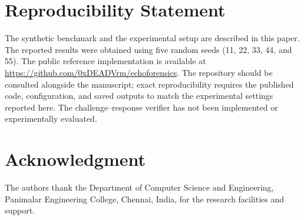 \documentclass[conference]{IEEEtran}
\begin{document}
\section*{Reproducibility Statement}
The synthetic benchmark and the experimental setup are described in this paper. The reported results were obtained using five random seeds (11, 22, 33, 44, and 55). The public reference implementation is available at \url{https://github.com/0xDEADVrm/echoforensics}. The repository should be consulted alongside the manuscript; exact reproducibility requires the published code, configuration, and saved outputs to match the experimental settings reported here. The challenge--response verifier has not been implemented or experimentally evaluated.

\section*{Acknowledgment}
The authors thank the Department of Computer Science and Engineering, Panimalar Engineering College, Chennai, India, for the research facilities and support.
\end{document}
